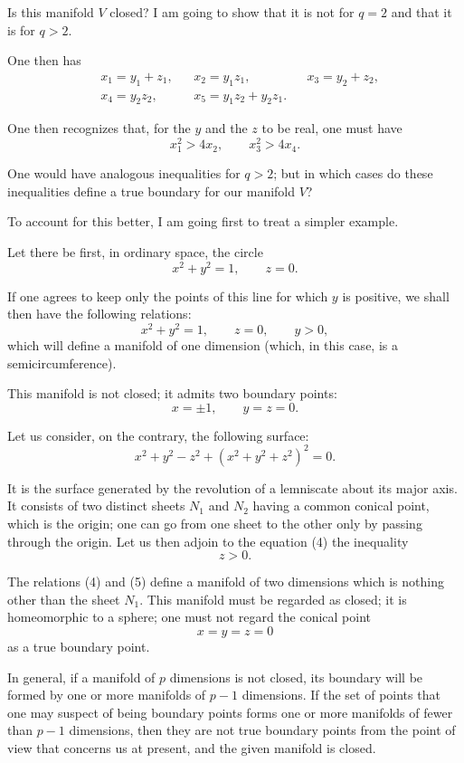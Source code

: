 \documentclass{article}
\begin{document}
Is this manifold $V$ closed? I am going to show that it is not for $q = 2$ and that it is for $q > 2$.

One then has
\[ \begin{aligned} &x_{1} = y_{1} + z_{1}, &&x_{2} = y_{1}z_{1}, &&x_{3} = y_{2} + z_{2},\\ &x_{4} = y_{2}z_{2}, &&x_{5} = y_{1}z_{2} + y_{2}z_{1}. \end{aligned} \]

One then recognizes that, for the $y$ and the $z$ to be real, one must have
\[ x^{2}_{1} > 4x_{2}, \qquad x^{2}_{3} > 4x_{4}. \]

One would have analogous inequalities for $q > 2$; but in which cases do these inequalities define a true boundary for our manifold $V$?

To account for this better, I am going first to treat a simpler example.

Let there be first, in ordinary space, the circle
\[ x^{2} + y^{2} = 1, \qquad z = 0. \]

If one agrees to keep only the points of this line for which $y$ is positive, we shall then have the following relations:
\[ x^{2} + y^{2} = 1, \qquad z = 0, \qquad y > 0, \]
which will define a manifold of one dimension (which, in this case, is a semicircumference).

This manifold is not closed; it admits two boundary points:
\[ x = \pm 1, \qquad y = z = 0. \]

Let us consider, on the contrary, the following surface:
\[ x^{2} + y^{2} - z^{2} + (x^{2} + y^{2} + z^{2})^{2} = 0. \tag{4} \]

It is the surface generated by the revolution of a lemniscate about its major axis. It consists of two distinct sheets $N_{1}$ and $N_{2}$ having a common conical point, which is the origin; one can go from one sheet to the other only by passing through the origin. Let us then adjoin to the equation (4) the inequality
\[ z > 0. \tag{5} \]

The relations (4) and (5) define a manifold of two dimensions which is nothing other than the sheet $N_{1}$. This manifold must be regarded as closed; it is homeomorphic to a sphere; one must not regard the conical point
\[ x = y = z = 0 \]
as a true boundary point.

In general, if a manifold of $p$ dimensions is not closed, its boundary will be formed by one or more manifolds of $p - 1$ dimensions. If the set of points that one may suspect of being boundary points forms one or more manifolds of fewer than $p - 1$ dimensions, then they are not true boundary points from the point of view that concerns us at present, and the given manifold is closed.
\end{document}
